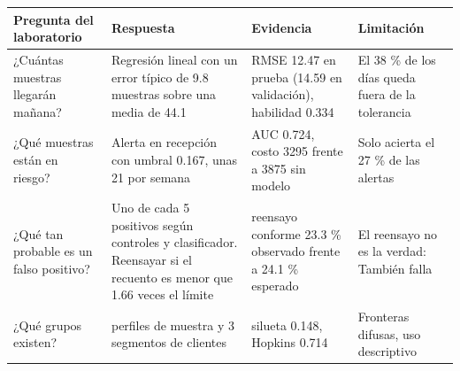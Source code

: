 \begin{tabular}{>{\raggedright\arraybackslash}p{2.8cm}>{\raggedright\arraybackslash}p{4.5cm}>{\raggedright\arraybackslash}p{3.8cm}>{\raggedright\arraybackslash}p{3.2cm}}
\toprule
Pregunta del laboratorio & Respuesta & Evidencia & Limitación \\
\midrule
¿Cuántas muestras llegarán mañana? & Regresión lineal con un error típico de 9.8 muestras sobre una media de 44.1 & RMSE 12.47 en prueba (14.59 en validación), habilidad 0.334 & El 38 \% de los días queda fuera de la tolerancia \\
¿Qué muestras están en riesgo? & Alerta en recepción con umbral 0.167, unas 21 por semana & AUC 0.724, costo 3295 frente a 3875 sin modelo & Solo acierta el 27 \% de las alertas \\
¿Qué tan probable es un falso positivo? & Uno de cada 5 positivos según controles y clasificador. Reensayar si el recuento es menor que 1.66 veces el límite & reensayo conforme 23.3 \% observado frente a 24.1 \% esperado & El reensayo no es la verdad: También falla \\
¿Qué grupos existen? & 4 perfiles de muestra y 3 segmentos de clientes & silueta 0.148, Hopkins 0.714 & Fronteras difusas, uso descriptivo \\
\bottomrule
\end{tabular}
